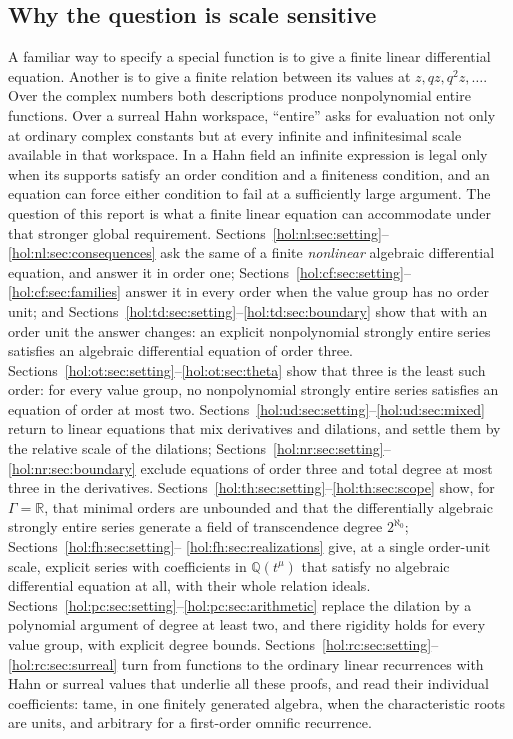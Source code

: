 \documentclass[11pt]{article}
\numberwithin{equation}{section}
\theoremstyle{definition}
\theoremstyle{remark}
\newcommand{\R}{\mathbb R}
\newcommand{\Q}{\mathbb Q}
\begin{document}
\subsection{Why the question is scale sensitive}

A familiar way to specify a special function is to give a finite linear
differential equation. Another is to give a finite relation between its values
at $z,qz,q^2z,\ldots$. Over the complex numbers both descriptions produce
nonpolynomial entire functions. Over a surreal Hahn workspace, ``entire'' asks
for evaluation not only at ordinary complex constants but at every infinite
and infinitesimal scale available in that workspace. In a Hahn field an
infinite expression is legal only when its supports satisfy an order condition
and a finiteness condition, and an equation can force either condition to fail
at a sufficiently large argument. The question of this report is what a finite
linear equation can accommodate under that stronger global requirement.
Sections~\ref{hol:nl:sec:setting}--\ref{hol:nl:sec:consequences} ask the same
of a finite \emph{nonlinear} algebraic differential equation, and answer it in
order one; Sections~\ref{hol:cf:sec:setting}--\ref{hol:cf:sec:families}
answer it in every order when the value group has no order unit; and
Sections~\ref{hol:td:sec:setting}--\ref{hol:td:sec:boundary} show that with an
order unit the answer changes: an explicit nonpolynomial strongly entire
series satisfies an algebraic differential equation of order three.
Sections~\ref{hol:ot:sec:setting}--\ref{hol:ot:sec:theta} show that three is
the least such order: for every value group, no nonpolynomial strongly entire
series satisfies an equation of order at most two.
Sections~\ref{hol:ud:sec:setting}--\ref{hol:ud:sec:mixed} return to linear
equations that mix derivatives and dilations, and settle them by the relative
scale of the dilations; Sections~\ref{hol:nr:sec:setting}--%
\ref{hol:nr:sec:boundary} exclude equations of order three and total degree
at most three in the derivatives.
Sections~\ref{hol:th:sec:setting}--\ref{hol:th:sec:scope} show, for
$\Gamma=\R$, that minimal orders are unbounded and that the differentially
algebraic strongly entire series generate a field of transcendence degree
$2^{\aleph_0}$; Sections~\ref{hol:fh:sec:setting}--%
\ref{hol:fh:sec:realizations} give, at a single order-unit scale, explicit
series with coefficients in $\Q(t^\mu)$ that satisfy no algebraic differential
equation at all, with their whole relation ideals.
Sections~\ref{hol:pc:sec:setting}--\ref{hol:pc:sec:arithmetic} replace the
dilation by a polynomial argument of degree at least two, and there rigidity
holds for every value group, with explicit degree bounds.
Sections~\ref{hol:rc:sec:setting}--\ref{hol:rc:sec:surreal} turn from
functions to the ordinary linear recurrences with Hahn or surreal values that
underlie all these proofs, and read their individual coefficients: tame, in
one finitely generated algebra, when the characteristic roots are units, and
arbitrary for a first-order omnific recurrence.
\end{document}
